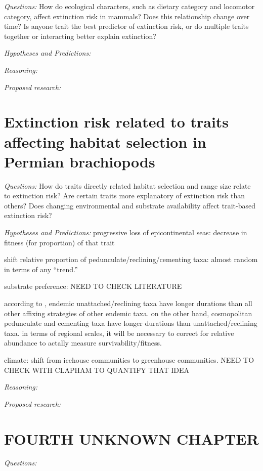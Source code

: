 \documentclass[12pt,letterpaper]{article}
\begin{document}
\textit{Questions:} How do ecological characters, such as dietary category and locomotor category, affect extinction risk in mammals? Does this relationship change over time? Is anyone trait the best predictor of extinction risk, or do multiple traits together or interacting better explain extinction?

\textit{Hypotheses and Predictions:}

\textit{Reasoning:}

\textit{Proposed research:}


\section{Extinction risk related to traits affecting habitat selection in Permian brachiopods}

\textit{Questions:} How do traits directly related habitat selection and range size relate to extinction risk? Are certain traits more explanatory of extinction risk than others? Does changing environmental and substrate availability affect trait-based extinction risk?

\textit{Hypotheses and Predictions:}
progressive loss of epicontinental seas: decrease in fitness (for proportion) of that trait

shift relative proportion of pedunculate/reclining/cementing taxa: almost random \citep{Clapham2007} in terms of any ``trend.'' 

substrate preference: NEED TO CHECK LITERATURE

according to \citet{Alexander1977}, endemic unattached/reclining taxa have longer durations than all other affixing strategies of other endemic taxa. on the other hand, cosmopolitan pedunculate and cementing taxa have longer durations than unattached/reclining taxa. in terms of regional scales, it will be necessary to correct for relative abundance to actally measure survivability/fitness.

climate: shift from icehouse communities to greenhouse communities. NEED TO CHECK WITH CLAPHAM TO QUANTIFY THAT IDEA


\textit{Reasoning:}

\textit{Proposed research:}


\section{FOURTH UNKNOWN CHAPTER}

\textit{Questions:}
\end{document}
